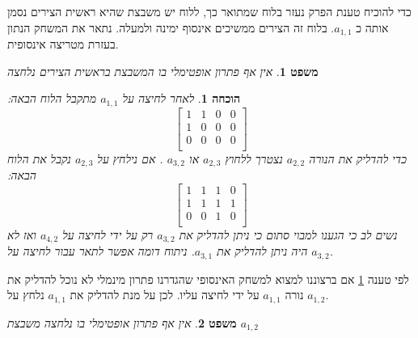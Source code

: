 \documentclass[12pt,leqno]{article}
\theoremstyle{theoremdd}
\newtheorem{theorem}{משפט}[section]
\newtheorem*{prove}{הוכחה}
\begin{document}
כדי להוכיח טענת הפרק נעזר בלוח שמתואר כך,
ללוח יש משבצת שהיא ראשית הצירים 
נסמן אותה כ 
$a_{1,1}$.
בלוח זה  הצירים ממשיכים אינסוף ימינה ולמעלה.
נתאר את המשחק הנתון בעזרת מטריצה אינסופית.
\begin{theorem}
    \label{thm:cant-press-a11}
    אין אף פתרון 
    אופטימלי בו המשבצת בראשית הצירים נלחצה 
\end{theorem}
\begin{prove}
    לאחר לחיצה על 
    $a_{1,1}$
    מתקבל הלוח הבאה:
    \[
        \begin{bmatrix}
            1 & 1 & 0 & 0 \\
            1 & 0 & 0 & 0 \\
            0 & 0 & 0 & 0 \\
        \end{bmatrix}
    \]
    כדי להדליק 
    את הנורה
    $a_{2,2}$
    נצטרך 
    ללחוץ
    $a_{2,3}$
    או 
    $a_{3,2}$
    .
    אם נילחץ על
   $a_{2,3}$
   נקבל את הלוח הבאה:
   \[
        \begin{bmatrix}
            1 & 1 & 1 & 0 \\
            1 & 1 & 1 & 1 \\
            0 & 0 & 1 & 0 \\
        \end{bmatrix}
    \]
    נשים לב כי הגענו למבוי סתום כי
    ניתן להדליק את 
    $a_{3,2}$
    רק על ידי לחיצה על 
   $a_{4,2}$ 
   ואז לא היה ניתן להדליק את 
   $a_{3,1}$.
   ניתוח דומה אפשר לתאר עבור 
   לחיצה על 
   $a_{3,2}$.
\end{prove}
לפי טענה
\ref{thm:cant-press-a11}
אם ברצוננו למצוא למשחק האינסופי שהגדרנו פתרון מינמלי לא נוכל 
להדליק את נורה 
$a_{1,1}$
על ידי לחיצה עליו.
לכן על מנת להדליק את 
$a_{1,1}$
נלחץ על 
$a_{1,2}$.
\begin{theorem}
    \label{thm:cant-press-a12}
    אין אף פתרון 
    אופטימלי בו נלחצה 
    משבצת
    $a_{1,2}$
\end{theorem}
\end{document}
